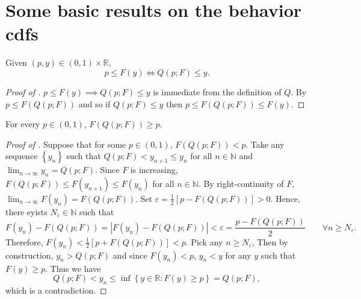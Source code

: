 
\section{Some basic results on the behavior cdfs}
\label{sec--cdf-behavior}

\begin{lemma}
\label{lem--p-leq-Fy-iff-Qp-leq-y}
Given \((p, y) \in (0, 1) \times \mathbb{R}\),
\begin{equation}
  p \leq F (y) \iff Q (p; F) \leq y.
  \label{eqn--p-leq-Fy-iff-Qp-leq-y}
\end{equation}
\end{lemma}

\begin{proof}[Proof of ]
\(p \leq F (y) \implies Q (p; F) \leq y\) is immediate from the definition of
\(Q\).
By  \(p \leq F (Q (p; F))\) and so if \(Q (p; F) \leq y\)
then \(p \leq F (Q (p; F)) \leq F (y)\).
\end{proof}

\begin{lemma}
\label{lem--FQ-geq-p}
For every \(p \in (0, 1)\), \(F (Q (p; F)) \geq p\).
\end{lemma}

\begin{proof}[Proof of ]
Suppose that for some \(p \in (0, 1)\), \(F (Q (p; F)) < p\).
Take any sequence \(\left\{ y_{n} \right\}\) such that \(Q (p; F) < y_{n + 1}
\leq y_{n}\) for all \(n \in \mathbb{N}\) and \(\lim_{n \to
\infty} y_{n} = Q (p; F)\).
Since \(F\) is increasing, \(F (Q (p; F)) \leq F \left( y_{n + 1} \right) \leq F
\left( y_{n} \right)\) for all \(n \in \mathbb{N}\).
By right-continuity of \(F\), \(\lim_{n \to \infty} F \left( y_{n} \right) = F
(Q (p; F))\).
Set \(\varepsilon = \frac{1}{2} [p - F (Q (p; F))] > 0\).
Hence, there eyists \(N_{\varepsilon} \in \mathbb{N}\) such that
\begin{equation}
  F \left( y_{n} \right) - F (Q (p; F)) = \left| F \left( y_{n} \right) - F (Q
  (p; F)) \right| < \varepsilon = \frac{p - F (Q (p; F))}{2} \qquad \forall n
  \geq N_{\varepsilon}.
\end{equation}
Therefore, \(F \left( y_{n} \right) < \frac{1}{2} [p + F (Q (p; F))] < p\).
Pick any \(n \geq N_{\varepsilon}\),
Then by construction, \(y_{n} > Q (p; F)\) and since \(F \left( y_{n} \right) <
p\), \(y_{n} < y\) for any \(y\) such that \(F (y) \geq p\).
Thus we have
\begin{equation*}
  Q (p; F) < y_{n} \leq \inf \left\{ y \in \mathbb{R} : F (y) \geq p \right\} =
  Q (p; F),
\end{equation*}
which is a contradiction.
\end{proof}


